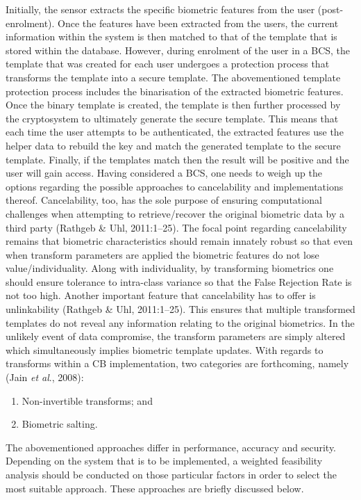 Initially, the sensor extracts the specific biometric features from the user (post-enrolment). Once the features have been extracted from the users, the current information within the system is then matched to that of the template that is stored within the database. However, during enrolment of the user in a BCS, the template that was created for each user undergoes a protection process that transforms the template into a secure template. The abovementioned template protection process includes the binarisation of the extracted biometric features. Once the binary template is created, the template is then further processed by the cryptosystem to ultimately generate the secure template. This means that each time the user attempts to be authenticated, the extracted features use the helper data to rebuild the key and match the generated template to the secure template. Finally, if the templates match then the result will be positive and the user will gain access. 
Having considered a BCS, one needs to weigh up the options regarding the possible approaches to cancelability and implementations thereof. Cancelability, too, has the sole purpose of ensuring computational challenges when attempting to retrieve/recover the original biometric data by a third party (Rathgeb \& Uhl, 2011:1–25). The focal point regarding cancelability remains that biometric characteristics should remain innately robust so that even when transform parameters are applied the biometric features do not lose value/individuality. Along with individuality, by transforming biometrics one should ensure tolerance to intra-class variance so that the False Rejection Rate is not too high. Another important feature that cancelability has to offer is unlinkability (Rathgeb \& Uhl, 2011:1–25). This ensures that multiple transformed templates do not reveal any information relating to the original biometrics. In the unlikely event of data compromise, the transform parameters are simply altered which simultaneously implies biometric template updates. 
With regards to transforms within a CB implementation, two categories are forthcoming, namely (Jain \textit{et al}., 2008):
  

\begin{enumerate}[label=\roman*.]
	\item Non-invertible transforms; and
	\item Biometric salting.
\end{enumerate}

The abovementioned approaches differ in performance, accuracy and security. Depending on the system that is to be implemented, a weighted feasibility analysis should be conducted on those particular factors in order to select the most suitable approach. These approaches are briefly discussed below.

